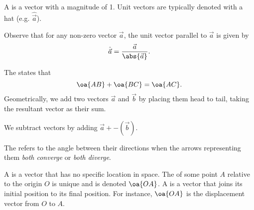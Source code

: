 \begin{definition}
    A  is a vector with a magnitude of 1. Unit vectors are typically denoted with a hat (e.g. $\hat{\vec a}$).
\end{definition}
Observe that for any non-zero vector $\vec a$, the unit vector parallel to $\vec a$ is given by \[\hat{\vec a} = \frac{\vec a}{\abs{\vec a}}.\]

\begin{definition}
    The  states that \[\oa{AB} + \oa{BC} = \oa{AC}.\] Geometrically, we add two vectors $\vec a$ and $\vec b$ by placing them head to tail, taking the resultant vector as their sum.

    \begin{center}
    \end{center}

    We subtract vectors by adding $\vec a + -(\vec b)$.
\end{definition}

\begin{definition}
    The  refers to the angle between their directions when the arrows representing them \textit{both converge} or \textit{both diverge}.
\end{definition}

\begin{definition}
    A  is a vector that has no specific location in space. The  of some point $A$ relative to the origin $O$ is unique and is denoted $\oa{OA}$. A  is a vector that joins its initial position to its final position. For instance, $\oa{OA}$ is the displacement vector from $O$ to $A$.
\end{definition}

